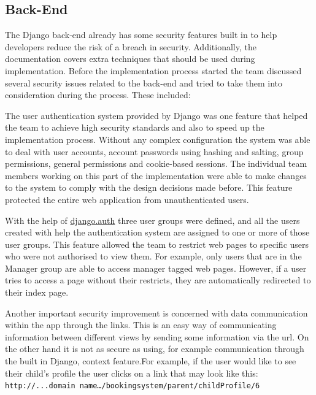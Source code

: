 \documentclass{l3proj}
\begin{document}
\subsection{Back-End}
The Django back-end already has some security features built in to help developers reduce the risk of a breach in security. Additionally, the documentation covers extra techniques that should be used during implementation. Before the implementation process started the team discussed several security issues related to the back-end and tried to take them into consideration during the process. These included:\\
\par 
The user authentication system provided by Django was one feature that helped the team to achieve high security standards and also to speed up the implementation process. Without any complex configuration the system was able to deal with user accounts, account passwords using hashing and salting, group permissions, general permissions and cookie-based sessions. The individual team members working on this part of the implementation were able to make changes to the system to comply with the design decisions made before. This feature protected the entire web application from unauthenticated users.\\
\par 
With the help of \underline{django.auth} three user groups were defined, and all the users created with help the authentication system are assigned to one or more of those user groups. This feature allowed the team to restrict web pages to specific users who were not authorised to view them. For example, only users that are in the Manager group are able to access manager tagged web pages. However, if a user tries to access a page without their restricts, they are automatically redirected to their index page. \\
\par 
Another important security improvement is concerned with data communication within the app through the links. This is an easy way of communicating information between different views by sending some information via the url. On the other hand it is not as secure as using, for example communication through the built in Django, context feature.For example, if the user would like to see their child’s profile the user clicks on a link that may look like this:\\
\texttt{http://...domain name…/bookingsystem/parent/childProfile/6}
\end{document}
